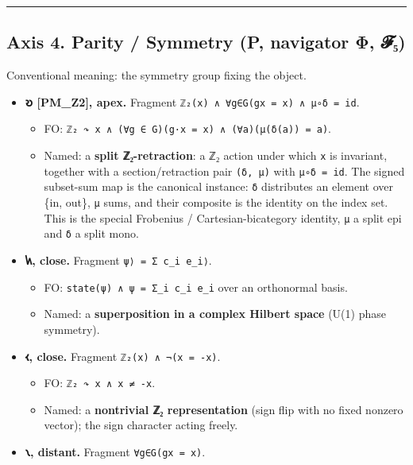\begin{center}\rule{0.5\linewidth}{0.5pt}\end{center}

\hypertarget{axis-4.-parity-symmetry-p-navigator-ux3c6-ux1d4d5ux2085}{%
\subsection{Axis 4. Parity / Symmetry (P, navigator Φ,
𝓕₅)}\label{axis-4.-parity-symmetry-p-navigator-ux3c6-ux1d4d5ux2085}}

Conventional meaning: the symmetry group fixing the object.

\begin{itemize}
\tightlist
\item
  \textbf{𐑹 {[}PM\_Z2{]}, apex.} Fragment
  \texttt{ℤ₂(x)\ ∧\ ∀g∈G(gx\ =\ x)\ ∧\ μ∘δ\ =\ id}.

  \begin{itemize}
  \tightlist
  \item
    FO:
    \texttt{ℤ₂\ ↷\ x\ ∧\ (∀g\ ∈\ G)(g·x\ =\ x)\ ∧\ (∀a)(μ(δ(a))\ =\ a)}.
  \item
    Named: a \textbf{split ℤ₂-retraction}: a ℤ₂ action under which
    \texttt{x} is invariant, together with a section/retraction pair
    \texttt{(δ,\ μ)} with \texttt{μ∘δ\ =\ id}. The signed subset-sum map
    is the canonical instance: \texttt{δ} distributes an element over
    \{in, out\}, \texttt{μ} sums, and their composite is the identity on
    the index set. This is the special Frobenius / Cartesian-bicategory
    identity, \texttt{μ} a split epi and \texttt{δ} a split mono.
  \end{itemize}
\item
  \textbf{𐑿, close.} Fragment
  \texttt{\textbar{}ψ⟩\ =\ Σ\ c\_i\ \textbar{}e\_i⟩}.

  \begin{itemize}
  \tightlist
  \item
    FO: \texttt{state(ψ)\ ∧\ ψ\ =\ Σ\_i\ c\_i\ e\_i} over an orthonormal
    basis.
  \item
    Named: a \textbf{superposition in a complex Hilbert space} (U(1)
    phase symmetry).
  \end{itemize}
\item
  \textbf{𐑬, close.} Fragment \texttt{ℤ₂(x)\ ∧\ ¬(x\ =\ -x)}.

  \begin{itemize}
  \tightlist
  \item
    FO: \texttt{ℤ₂\ ↷\ x\ ∧\ x\ ≠\ -x}.
  \item
    Named: a \textbf{nontrivial ℤ₂ representation} (sign flip with no
    fixed nonzero vector); the sign character acting freely.
  \end{itemize}
\item
  \textbf{𐑯, distant.} Fragment \texttt{∀g∈G(gx\ =\ x)}.


\end{itemize}
